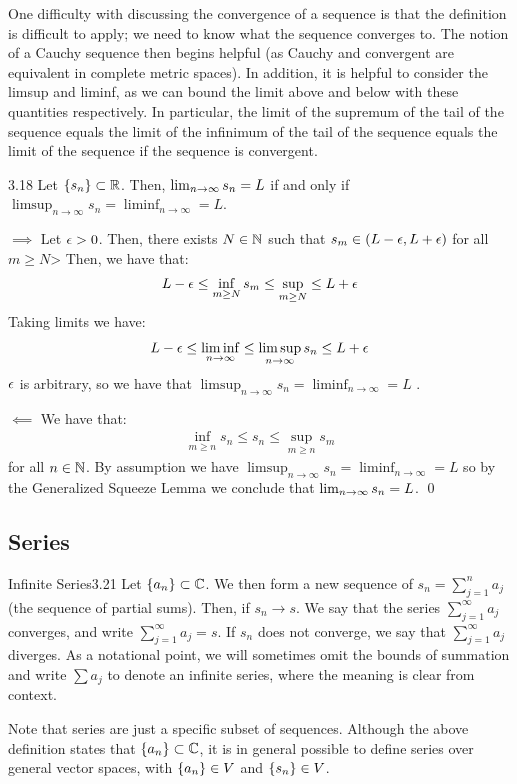 \noindent One difficulty with discussing the convergence of a sequence is that the definition is difficult to apply; we need to know what the sequence converges to. The notion of a Cauchy sequence then begins helpful (as Cauchy and convergent are equivalent in complete metric spaces). In addition, it is helpful to consider the limsup and liminf, as we can bound the limit above and below with these quantities respectively. In particular, the limit of the supremum of the tail of the sequence equals the limit of the infinimum of the tail of the sequence equals the limit of the sequence if the sequence is convergent.

\setcounter{rudin}{17}
\begin{theorem}{}{3.18}
    Let $\set{s_n} \subset \mathbb{R}$. Then, $\lim_{n \rightarrow \infty} s_n = L$ if and only if $\limsup_{n \rightarrow \infty} s_n = \liminf_{n \rightarrow \infty} = L$.
\end{theorem}
\begin{nproof}
    $\boxed{\implies}$ Let $\epsilon > 0$. Then, there exists $N \in \mathbb{N}$ such that $s_m \in (L - \epsilon, L + \epsilon)$ for all $m \geq N$> Then, we have that:
    \begin{align*}
        L - \epsilon \leq \inf_{m \geq N} s_m \leq \sup_{m \geq N} \leq L + \epsilon
    \end{align*}
    Taking limits we have:
    \begin{align*}
        L - \epsilon \leq \liminf_{n \rightarrow \infty} \leq \limsup_{n \rightarrow \infty} s_n  \leq L + \epsilon
    \end{align*}
    $\epsilon$ is arbitrary, so we have that $\limsup_{n \rightarrow \infty} s_n = \liminf_{n \rightarrow \infty} = L$ .

    $\boxed{\impliedby}$ We have that:
    \begin{align*}
        \inf_{m \geq n} s_n \leq s_n \leq \sup_{m \geq n} s_m
    \end{align*}
    for all $n \in \mathbb{N}$. By assumption we have $\limsup_{n \rightarrow \infty} s_n = \liminf_{n \rightarrow \infty} = L$ so by the Generalized Squeeze Lemma we conclude that $\lim_{n \rightarrow \infty} s_n = L$. \qed
\end{nproof}
\subsection{Series}

\setcounter{rudin}{20}
\begin{definition}{Infinite Series}{3.21}
    Let $\set{a_n} \subset \mathbb{C}$. We then form a new sequence of $s_n = \sum_{j=1}^n a_j$ (the sequence of partial sums). Then, if $s_n \rightarrow s$. We say that the series $\sum_{j = 1}^\infty a_j$ converges, and write $\sum_{j = 1}^\infty a_j = s$. If $s_n$ does not converge, we say that $\sum_{j=1}^\infty a_j$ diverges. As a notational point, we will sometimes omit the bounds of summation and write $\sum a_j$ to denote an infinite series, where the meaning is clear from context.
\end{definition}
\noindent Note that series are just a specific subset of sequences. Although the above definition states that $\set{a_n} \subset \mathbb{C}$, it is in general possible to define series over general vector spaces, with $\set{a_n} \in V$ and $\set{s_n} \in V$. 

